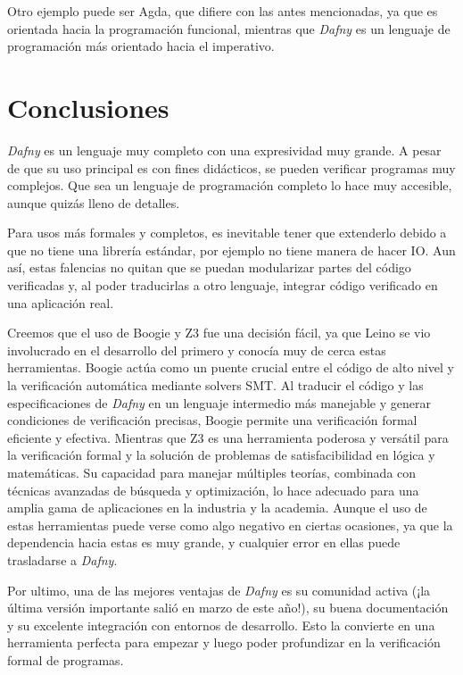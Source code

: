 \documentclass[runningheads]{llncs}
\begin{document}
Otro ejemplo puede ser Agda, que difiere con las antes mencionadas, ya que 
es orientada hacia la programación funcional, mientras que \textit{Dafny} es un lenguaje de programación más orientado hacia el imperativo. 
 
\section{Conclusiones}

\textit{Dafny} es un lenguaje muy completo con una expresividad muy grande. A pesar de que su uso principal es con fines didácticos, se pueden verificar programas muy complejos. 
Que sea un lenguaje de programación completo lo hace muy accesible, aunque quizás lleno de detalles.

Para usos más formales y completos, es inevitable tener que extenderlo debido a que no tiene una librería estándar, por ejemplo no tiene manera de hacer IO.
Aun así, estas falencias no quitan que se puedan modularizar partes del código verificadas y, al poder traducirlas a otro lenguaje, integrar código verificado en una aplicación real.

Creemos que el uso de Boogie y Z3 fue una decisión fácil, ya que Leino se vio involucrado en el desarrollo del primero y conocía muy de cerca estas herramientas.
Boogie actúa como un puente crucial entre el código de alto nivel y la verificación automática mediante solvers SMT. 
Al traducir el código y las especificaciones de \textit{Dafny} en un lenguaje intermedio más manejable y generar condiciones de verificación precisas, 
Boogie permite una verificación formal eficiente y efectiva.
Mientras que Z3 es una herramienta poderosa y versátil para la verificación formal y la solución de problemas de satisfacibilidad en lógica y matemáticas. 
Su capacidad para manejar múltiples teorías, combinada con técnicas avanzadas de búsqueda y optimización, 
lo hace adecuado para una amplia gama de aplicaciones en la industria y la academia.
Aunque el uso de estas herramientas puede verse como algo negativo en ciertas ocasiones, ya que la dependencia hacia estas es muy grande, y cualquier error en ellas puede trasladarse a \textit{Dafny}.

Por ultimo, una de las mejores ventajas de \textit{Dafny} es su comunidad activa (¡la última versión importante salió en marzo de este año!), 
su buena documentación y su excelente integración con entornos de desarrollo. Esto la convierte en una herramienta perfecta para empezar 
y luego poder profundizar en la verificación formal de programas.



\end{document}
